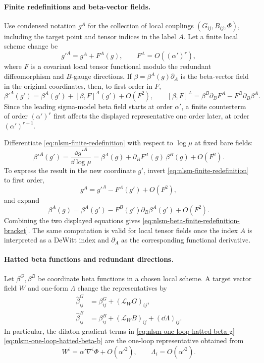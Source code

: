 \paragraph{Finite redefinitions and beta-vector fields.}
Use condensed notation \(g^A\) for the collection of local couplings
\((G_{ij},B_{ij},\Phi)\), including the target point and tensor indices in
the label \(A\).  Let a finite local scheme change be
\begin{equation}
  g'^A
  =
  g^A+F^A(g),
  \qquad
  F^A=O((\alpha')^r),
  \label{eq:nlsm-finite-redefinition}
\end{equation}
where \(F\) is a covariant local tensor functional modulo the redundant
diffeomorphism and \(B\)-gauge directions.  If
\(\beta=\beta^A(g)\partial_A\) is the beta-vector field in the original
coordinates, then, to first order in \(F\),
\begin{equation}
  \beta'^A(g')
  =
  \beta^A(g')
  +
  [\beta,F]^A(g')
  +
  O(F^2),
  \qquad
  [\beta,F]^A
  =
  \beta^B\partial_BF^A
  -
  F^B\partial_B\beta^A .
  \label{eq:nlsm-beta-finite-redefinition-bracket}
\end{equation}
Since the leading sigma-model beta field starts at order \(\alpha'\), a
finite counterterm of order \((\alpha')^r\) first affects the displayed
representative one order later, at order \((\alpha')^{r+1}\).

Differentiate \eqref{eq:nlsm-finite-redefinition} with respect to
\(\log\mu\) at fixed bare fields:
\[
  \beta'^A(g')
  =
  \frac{\dd g'^A}{\dd\log\mu}
  =
  \beta^A(g)+\partial_BF^A(g)\,\beta^B(g)+O(F^2).
\]
To express the result in the new coordinate \(g'\), invert
\eqref{eq:nlsm-finite-redefinition} to first order,
\[
  g^A=g'^A-F^A(g')+O(F^2),
\]
and expand
\[
  \beta^A(g)
  =
  \beta^A(g')-F^B(g')\partial_B\beta^A(g')+O(F^2).
\]
Combining the two displayed equations gives
\eqref{eq:nlsm-beta-finite-redefinition-bracket}.  The same computation is
valid for local tensor fields once the index \(A\) is interpreted as a
DeWitt index and \(\partial_A\) as the corresponding functional derivative.

\paragraph{Hatted beta functions and redundant directions.}
Let \(\beta^G,\beta^B\) be coordinate beta functions in a chosen local
scheme.  A target vector field \(W\) and one-form \(\Lambda\) change the
representatives by
\begin{align}
  \widehat\beta^G_{ij}
  &=
  \beta^G_{ij}+(\mathcal L_WG)_{ij},
  \label{eq:nlsm-hatted-beta-g-redundant}\\
  \widehat\beta^B_{ij}
  &=
  \beta^B_{ij}+(\mathcal L_WB)_{ij}+(\dd\Lambda)_{ij}.
  \label{eq:nlsm-hatted-beta-b-redundant}
\end{align}
In particular, the dilaton-gradient terms in
\eqref{eq:nlsm-one-loop-hatted-beta-g}--\eqref{eq:nlsm-one-loop-hatted-beta-b}
are the one-loop representative obtained from
\begin{equation}
  W^i=\alpha'\nabla^i\Phi+O(\alpha'^2),
  \qquad
  \Lambda_i=O(\alpha'^2).
  \label{eq:nlsm-dilaton-gradient-redundant-vector}
\end{equation}


